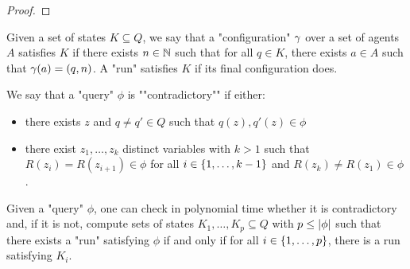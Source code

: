 

\begin{lemma}[Copycat]\label{lem:copycat}
%		
	
	
	
\end{lemma}

\begin{proof}
\end{proof}

\begin{definition}
	Given a set of states $K \subseteq Q$, we say that a "configuration" $\gamma$ over a set of agents $A$ satisfies $K$ if there exists $n \in \mathbb{N}$ such that for all $q \in K$, there exists $a \in A$ such that $\gamma(a) = (q,n)$.
	A "run" satisfies $K$ if its final configuration does.
\end{definition}

\begin{lemma}
	We say that a "query" $\phi$ is ""contradictory"" if either:
	\begin{itemize}
		\item there exists $z$ and $q \neq q' \in Q$ such that $q(z), q'(z) \in \phi$
		
		\item there exist $z_1, \ldots, z_k$ distinct variables with $k>1$ such that $R(z_{i}) = R(z_{i+1}) \in \phi$ for all $i \in \{1,\ldots,k-1\}$ and $R(z_k) \neq R(z_1) \in \phi$.
	\end{itemize}
	 
	
	Given a "query" $\phi$, one can check in polynomial time whether it is contradictory and, if it is not, compute sets of states $K_1, \ldots, K_p \subseteq Q$ with $p \leq |\phi|$ such that there exists a "run" satisfying $\phi$ if and only if for all $i \in \{1,\ldots, p\}$, there is a run satisfying $K_i$. 
\end{lemma}

